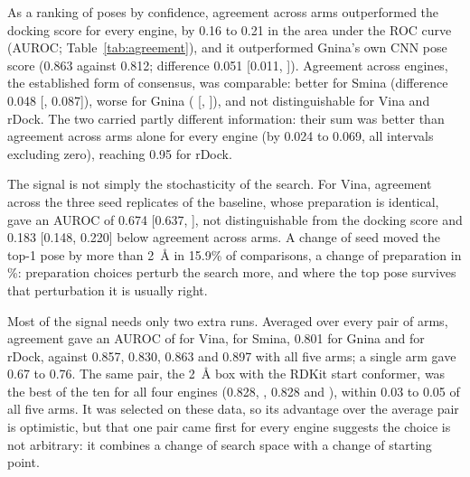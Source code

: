 As a ranking of poses by confidence, agreement across arms outperformed the docking score
for every engine, by 0.16 to 0.21 in the area under the ROC curve (AUROC;
Table~\ref{tab:agreement}), and it outperformed Gnina's own CNN pose score (0.863 against
0.812; difference 0.051 [0.011, ]). Agreement across engines, the established form of
consensus, was comparable: better for Smina (difference 0.048 [, 0.087]), worse for
Gnina ( [, ]), and not distinguishable for Vina and rDock. The two
carried partly different information: their sum was better than agreement across arms alone
for every engine (by 0.024 to 0.069, all intervals excluding zero), reaching 0.95 for
rDock.

The signal is not simply the stochasticity of the search. For Vina, agreement across the
three seed replicates of the baseline, whose preparation is identical, gave an AUROC of
0.674 [0.637, ], not distinguishable from the docking score and 0.183 [0.148, 0.220]
below agreement across arms. A change of seed moved the top-1 pose by more than
\SI{2}{\angstrom} in 15.9\% of comparisons, a change of preparation in \%: preparation
choices perturb the search more, and where the top pose survives that perturbation it is
usually right.

Most of the signal needs only two extra runs. Averaged over every pair of arms, agreement
gave an AUROC of  for Vina,  for Smina, 0.801 for Gnina and  for rDock,
against 0.857, 0.830, 0.863 and 0.897 with all five arms; a single arm gave 0.67 to 0.76.
The same pair, the \SI{2}{\angstrom} box with the RDKit start conformer, was the best of the
ten for all four engines (0.828, , 0.828 and ), within 0.03 to 0.05 of all five
arms. It was selected on these data, so its advantage over the average pair is optimistic,
but that one pair came first for every engine suggests the choice is not arbitrary: it
combines a change of search space with a change of starting point.

